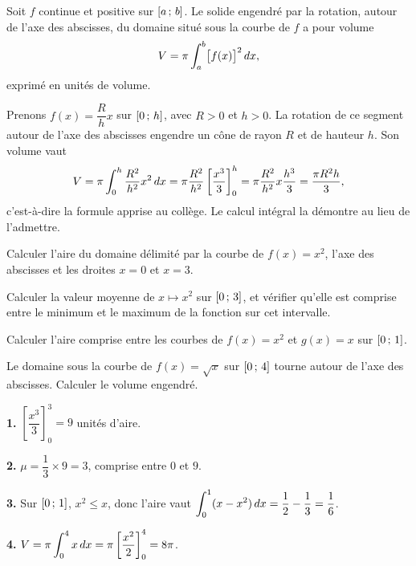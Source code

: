\begin{theoreme}
Soit $f$ continue et positive sur $\left[a\,;\,b\right]$. Le solide engendré par
la rotation, autour de l'axe des abscisses, du domaine situé sous la courbe de
$f$ a pour volume
\[
  V = \pi \int_{a}^{b} \bigl[f(x)\bigr]^{2}\,dx ,
\]
exprimé en unités de volume.
\end{theoreme}

\begin{exemple}
Prenons $f(x) = \dfrac{R}{h}x$ sur $\left[0\,;\,h\right]$, avec $R>0$ et $h>0$.
La rotation de ce segment autour de l'axe des abscisses engendre un cône de
rayon $R$ et de hauteur $h$. Son volume vaut
\[
  V = \pi \int_{0}^{h} \frac{R^{2}}{h^{2}}x^{2}\,dx
    = \pi \frac{R^{2}}{h^{2}}\left[\frac{x^{3}}{3}\right]_{0}^{h}
    = \pi \frac{R^{2}}{h^{2}} x \frac{h^{3}}{3}
    = \frac{\pi R^{2} h}{3},
\]
c'est-à-dire la formule apprise au collège. Le calcul intégral la démontre au
lieu de l'admettre.
\end{exemple}

\begin{entrainement}
\exo[\niveau{1}] Calculer l'aire du domaine délimité par la courbe de
$f(x) = x^{2}$, l'axe des abscisses et les droites $x=0$ et $x=3$.

\exo[\niveau{2}] Calculer la valeur moyenne de $x \mapsto x^{2}$ sur
$\left[0\,;\,3\right]$, et vérifier qu'elle est comprise entre le minimum et le
maximum de la fonction sur cet intervalle.

\exo[\niveau{2}] Calculer l'aire comprise entre les courbes de
$f(x) = x^{2}$ et $g(x) = x$ sur $\left[0\,;\,1\right]$.

\exo[\niveau{3}] Le domaine sous la courbe de $f(x) = \sqrt{x}$ sur
$\left[0\,;\,4\right]$ tourne autour de l'axe des abscisses. Calculer le volume
engendré.
\end{entrainement}

\begin{corrige}
\textbf{1.} $\left[\dfrac{x^{3}}{3}\right]_{0}^{3} = 9$ unités d'aire.

\textbf{2.} $\mu = \dfrac{1}{3}\times 9 = 3$, comprise entre $0$ et $9$.

\textbf{3.} Sur $\left[0\,;\,1\right]$, $x^{2} \leq x$, donc l'aire vaut
$\displaystyle\int_{0}^{1}(x-x^{2})\,dx = \dfrac12 - \dfrac13 = \dfrac16$.

\textbf{4.} $V = \pi\displaystyle\int_{0}^{4} x\,dx = \pi\left[\dfrac{x^{2}}{2}\right]_{0}^{4} = 8\pi$.
\end{corrige}

